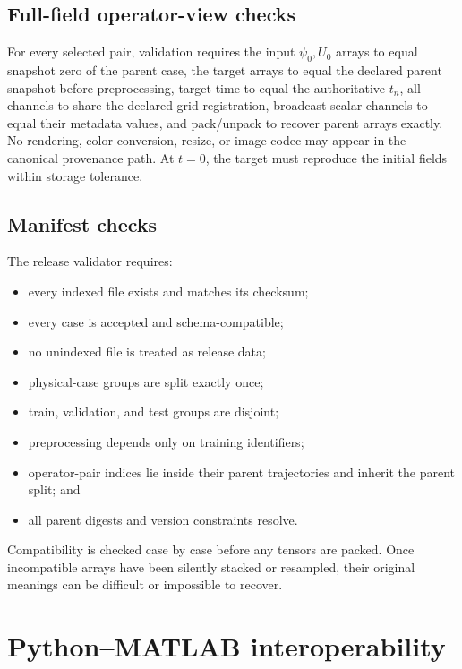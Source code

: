 \documentclass[11pt]{article}
\begin{document}
\subsection{Full-field operator-view checks}
For every selected pair, validation requires the input $\psi_0,U_0$ arrays to equal snapshot zero of the parent case, the target arrays to equal the declared parent snapshot before preprocessing, target time to equal the authoritative $t_n$, all channels to share the declared grid registration, broadcast scalar channels to equal their metadata values, and pack/unpack to recover parent arrays exactly. No rendering, color conversion, resize, or image codec may appear in the canonical provenance path. At $t=0$, the target must reproduce the initial fields within storage tolerance.

\subsection{Manifest checks}

The release validator requires:
\begin{itemize}
  \item every indexed file exists and matches its checksum;
  \item every case is accepted and schema-compatible;
  \item no unindexed file is treated as release data;
  \item physical-case groups are split exactly once;
  \item train, validation, and test groups are disjoint;
  \item preprocessing depends only on training identifiers;
  \item operator-pair indices lie inside their parent trajectories and inherit the parent split; and
  \item all parent digests and version constraints resolve.
\end{itemize}

\begin{checkpointbox}
Compatibility is checked case by case before any tensors are packed. Once incompatible arrays have been silently stacked or resampled, their original meanings can be difficult or impossible to recover.
\end{checkpointbox}

\section{Python--MATLAB interoperability}
\label{sec:interop}
\end{document}
